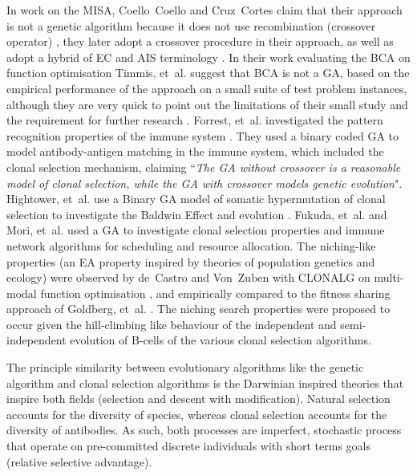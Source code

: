 In work on the MISA, Coello~Coello and Cruz~Cortes claim that their approach is not a genetic algorithm because it does not use recombination (crossover operator) \cite{Coello2002}, they later adopt a crossover procedure in their approach, as well as adopt a hybrid of EC and AIS terminology \cite{Cortes2003}. In their work evaluating the BCA on function optimisation Timmis, et~al. suggest that BCA is not a GA, based on the empirical performance of the approach on a small suite of test problem instances, although they are very quick to point out the limitations of their small study and the requirement for further research \cite{Timmis2004a}. Forrest, et~al. investigated the pattern recognition properties of the immune system \cite{Forrest1993a}. They used a binary coded GA to model antibody-antigen matching in the immune system, which included the clonal selection mechanism, claiming ``\emph{The GA without crossover is a reasonable model of clonal selection, while the GA with crossover models genetic evolution}". Hightower, et~al. use a Binary GA model of somatic hypermutation of clonal selection to investigate the Baldwin Effect and evolution \cite{Hightower1995}. Fukuda, et~al. \cite{Fukuda1993} and Mori, et~al. \cite{Mori1993a} used a GA to investigate clonal selection properties and immune network algorithms for scheduling and resource allocation. The niching-like properties (an EA property inspired by theories of population genetics and ecology) were observed by de~Castro and Von~Zuben with CLONALG on multi-modal function optimisation \cite{Castro2002}, and empirically compared to the fitness sharing approach of Goldberg, et~al. \cite{Goldberg1989a, Goldberg1987, Deb1989}. The niching search properties were proposed to occur given the hill-climbing like behaviour of the independent and semi-independent evolution of B-cells of the various clonal selection algorithms. 

The principle similarity between evolutionary algorithms like the genetic algorithm and clonal selection algorithms is the Darwinian inspired theories that inspire both fields (selection and descent with modification). Natural selection accounts for the diversity of species, whereas clonal selection accounts for the diversity of antibodies. As such, both processes are imperfect, stochastic process that operate on pre-committed discrete individuals with short terms goals (relative selective advantage). 

